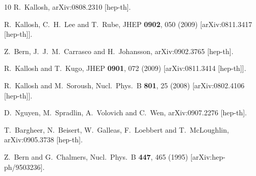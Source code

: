 \documentclass[12pt]{article}
\begin{document}
\begin{thebibliography}{10}
  R.~Kallosh,
  arXiv:0808.2310 [hep-th].

  R.~Kallosh, C.~H.~Lee and T.~Rube,
  JHEP {\bf 0902}, 050 (2009)
  [arXiv:0811.3417 [hep-th]].

  Z.~Bern, J.~J.~M.~Carrasco and H.~Johansson,
  arXiv:0902.3765 [hep-th].

  R.~Kallosh and T.~Kugo,
  JHEP {\bf 0901}, 072 (2009)
  [arXiv:0811.3414 [hep-th]].

 R.~Kallosh and M.~Soroush,
  Nucl.\ Phys.\  B {\bf 801}, 25 (2008)
  [arXiv:0802.4106 [hep-th]].

  D.~Nguyen, M.~Spradlin, A.~Volovich and C.~Wen,
  arXiv:0907.2276 [hep-th].

  T.~Bargheer, N.~Beisert, W.~Galleas, F.~Loebbert and T.~McLoughlin,
  arXiv:0905.3738 [hep-th].

 Z.~Bern and G.~Chalmers,
  Nucl.\ Phys.\  B {\bf 447}, 465 (1995)
  [arXiv:hep-ph/9503236].

\end{thebibliography}
\end{document}
